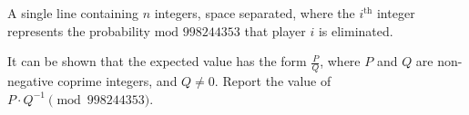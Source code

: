 A single line containing $n$ integers, space separated, where the $i^{\text{th}}$ integer represents the probability $\text{mod } 998244353$ that player $i$ is eliminated.

It can be shown that the expected value has the form $\frac{P}{Q}$, where $P$ and $Q$ are non-negative coprime integers, and $Q \neq 0$. Report the value of $P \cdot Q^{-1} \pmod{998244353}$.